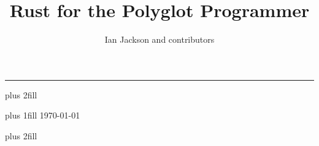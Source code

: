 \documentclass[a4paper]{memoir}
\title{Rust for the Polyglot Programmer}
\author{Ian Jackson and contributors}
\begin{document}
\frontmatter

\begin{titlingpage*}
  \addtolength{\oddsidemargin}{-\leftindent/2}
  \addtolength{\evensidemargin}{-\leftindent/2}

  \hrule height 0pt
  \vskip 0pt plus 2fill
  \begingroup
    \fontsize{32pt}{40pt}   \selectfont
    \raggedright \thetitle \par
  \endgroup
  \vskip 0pt plus 1fill
  \begingroup
    \fontsize{18pt}{22pt}   
    \selectfont
    \raggedleft
    \theauthor
    \vskip 8pt
    \fontsize{12pt}{15pt} \selectfont \today \par
  \endgroup
  \vskip 0pt plus 2fill
  
\end{titlingpage*}

\tableofcontents

\cleardoublepage
\mainmatter















\backmatter

\end{document}
